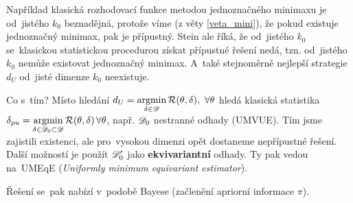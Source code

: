 \begin{dusl}
	Například klasická rozhodovací funkce metodou jednoznačného minimaxu je od~jistého $k_0$ beznadějná, protože víme (z věty \ref{veta_mini}), že pokud existuje jednoznačný minimax, pak je přípustný. Stein ale říká, že od~jistého $k_0$ se~klasickou statistickou procedurou získat přípustné řešení nedá, tzn. od~jistého $k_0$ nemůže existovat jednoznačný minimax. A~také stejnoměrně nejlepší strategie $d_U$ od~jisté dimenze $k_0$ neexistuje.
\end{dusl}
Co s~tím? Místo hledání $d_U=\mathop{\mathrm{argmin}}\limits_{\delta\in\mathscr{D} }\mathcal{R}(\theta,\delta),~\forall\theta$ hledá klasická statistika $\delta_{pu}=\mathop{\mathrm{argmin}}\limits_{\delta\in\mathscr{D} _0\subset\mathscr{D} }\mathcal{R}(\theta,\delta)\,\forall\theta$, např. $\mathscr{D} _0$ nestranné odhady (UMVUE). Tím jsme zajistili existenci, ale pro~vysokou dimenzi opět dostaneme nepřípustné řešení. Další možností je použít $\mathscr{D} _0'$ jako \textbf{ekvivariantní} odhady. Ty pak vedou na~UMEqE (\textit{Uniformly minimum equivariant estimator}).  

Řešení se~pak nabízí v~podobě Bayese (začlenění apriorní informace $\pi$).

